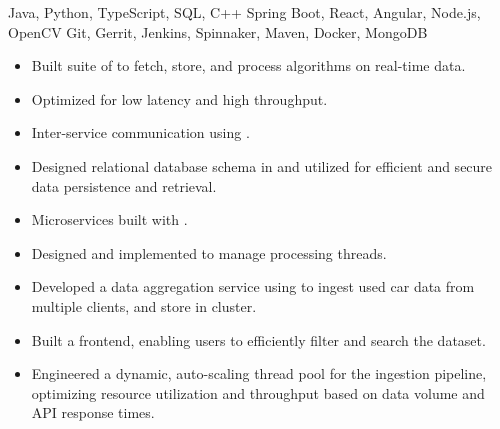  Java, Python, TypeScript, SQL, C++\newline
{} Spring Boot, React, Angular, Node.js, OpenCV\newline
{} Git, Gerrit, Jenkins, Spinnaker, Maven, Docker, MongoDB\newline


\begin{itemize}
  \item Built  suite of  to fetch, store, and process algorithms on real-time  data.
  \item Optimized for low latency and high throughput.
  \item Inter-service communication using .
  \item Designed relational database schema in  and utilized  for efficient and secure data persistence and retrieval.
  \item Microservices built with .
  \item Designed and implemented  to manage processing threads.
 \end{itemize}

\begin{itemize}
    \item Developed a data aggregation service using  to ingest used car data from multiple clients, and store in  cluster.
    \item Built a  frontend, enabling users to efficiently filter and search the dataset.
    \item Engineered a dynamic, auto-scaling thread pool for the ingestion pipeline, optimizing resource utilization and throughput based on data volume and API response times.
 \end{itemize}
 
